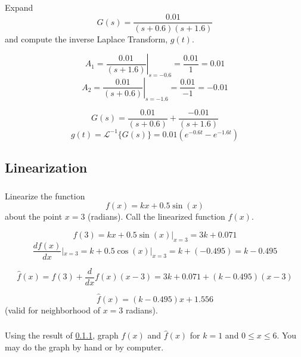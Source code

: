 \documentclass{article}	%
\newcommand{\sL}{\mathcal{L}}
\begin{document}
 \subsubsection{}

 Expand
 \[
 G(s) =  \frac              {0.01}                      {(s+0.6)(s+1.6)}
 \]
 and compute the inverse Laplace Transform, $g(t)$.



\begin{solution}
\[
A_1 = \left . \frac{0.01}{(s+1.6)} \right |_{s=-0.6} = \frac {0.01}{1} = 0.01
\]
\[
A_2 = \left . \frac{0.01}{(s+0.6)} \right |_{s=-1.6} = \frac {0.01}{-1} = -0.01
\]

\[
G(s) = \frac {0.01}{(s+0.6)}  + \frac {-0.01}{(s+1.6)}
\]
\[
g(t) = \sL^{-1}\{G(s)\} = 0.01(e^{-0.6t} - e^{-1.6t})
\]
\end{solution}



\subsection{Linearization}
 \subsubsection{}\label{linearizePone}
Linearize the function
\[
f(x) = kx + 0.5\sin(x)
\]
about the point $x=3$ (radians).  Call the linearized function $\hat{f}(x)$.

\begin{solution}
\[
f(3) = kx + 0.5\sin(x) |_{x=3} = 3k+0.071
\]
\[
\frac {df(x)}{dx}|_{x=3} = k + 0.5\cos(x)|_{x=3} = k+(-0.495) = k-0.495
\]

\[
\hat{f}(x) = f(3)+\frac{d}{dx}f(x)(x-3) = 3k+0.071+(k-0.495)(x-3)
\]

\[
\hat{f}(x) = (k-0.495)x+1.556
\]
(valid for neighborhood of $x=3$ radians).



\end{solution}



 \subsubsection{}
Using the result of \ref{linearizePone}, graph $f(x)$ and $\hat{f}(x)$ for $k=1$ and $0 \leq x \leq 6$.  You may do the graph by hand or by computer.
\end{document}
